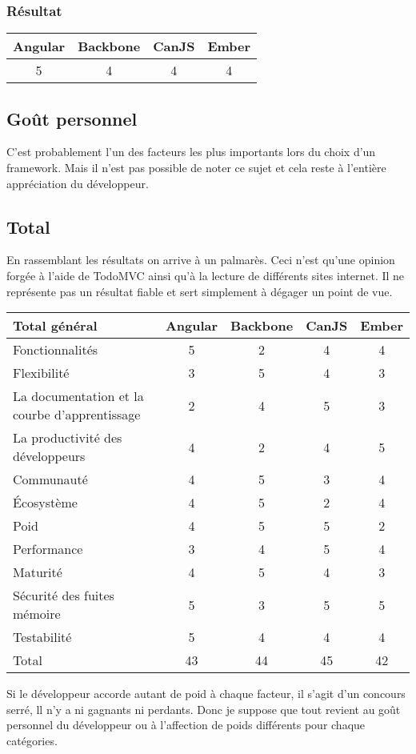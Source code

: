 \subsubsection{Résultat}
\begin{tabular}{|c|c|c|c|}
  \hline 
  Angular & Backbone & CanJS & Ember \\
  \hline 
  5 & 4 & 4 & 4 \\
  \hline
\end{tabular}


\subsection{Goût personnel}

C’est probablement l’un des facteurs les plus importants lors du choix d’un framework.
Mais il n’est pas possible de noter ce sujet et cela reste à l’entière appréciation du développeur.

\subsection{Total}

En rassemblant les résultats on arrive à un palmarès. Ceci n’est qu’une opinion forgée à l'aide de TodoMVC ainsi qu'à la lecture de différents sites internet. Il ne représente pas un résultat fiable et sert simplement à dégager un point de vue.


\begin{tabular}{|l|c|c|c|c|}
  \hline 
  Total général & Angular & Backbone & CanJS & Ember \\
  \hline 
  Fonctionnalités & 5 & 2 & 4 & 4 \\
  \hline 
  Flexibilité & 3 & 5 & 4 & 3 \\
  \hline 
  La documentation et la courbe d'apprentissage & 2 & 4 & 5 & 3 \\
  \hline 
  La productivité des développeurs & 4 & 2 & 4 & 5 \\
  \hline 
  Communauté & 4 & 5 & 3 & 4 \\
  \hline 
  Écosystème & 4 & 5 & 2 & 4 \\
  \hline
  Poid & 4 & 5 & 5 & 2 \\
  \hline
  Performance & 3 & 4 & 5 & 4 \\
  \hline
  Maturité & 4 & 5 & 4 & 3 \\
  \hline
  Sécurité des fuites mémoire & 5 & 3 & 5 & 5 \\
  \hline
  Testabilité & 5 & 4 & 4 & 4 \\
  \hline
  Total & 43 & 44 & 45 & 42 \\
  \hline
\end{tabular}

Si le développeur accorde autant de poid à chaque facteur, il s’agit d’un concours serré, ll n’y a ni gagnants ni perdants. Donc je suppose que tout revient au goût personnel du développeur ou à l’affection de poids différents pour chaque catégories.